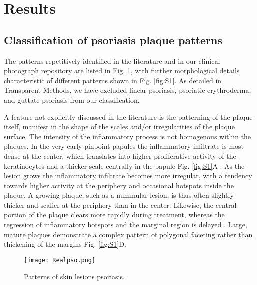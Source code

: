 \section{Results}
\subsection{Classification of psoriasis plaque patterns}
The patterns repetitively identified in the literature and in our clinical photograph repository are listed in Fig. \ref{fig:1}, with further morphological details characteristic of different patterns shown in Fig. \ref{fig:S1}. As detailed in Transparent Methods, we have excluded linear psoriasis, psoriatic erythroderma, and guttate psoriasis from our classification. 

A feature not explicitly discussed in the literature is the patterning of the plaque itself, manifest in the shape of the scales and/or irregularities of the plaque surface. The intensity of the inflammatory process is not homogenous within the plaques. In the very early pinpoint papules the inflammatory infiltrate is most dense at the center, which translates into higher proliferative activity of the keratinocytes and a thicker scale centrally in the papule Fig. \ref{fig:S1}A \citep{soltani1972}. As the lesion grows the inflammatory infiltrate becomes more irregular, with a tendency towards higher activity at the periphery and occasional hotspots inside the plaque. A growing plaque, such as a nummular lesion, is thus often slightly thicker and scalier at the periphery than in the center. Likewise, the central portion of the plaque clears more rapidly during treatment, whereas the regression of inflammatory hotspots and the marginal region is delayed \citep{griffin1988}. Large, mature plaques demonstrate a complex pattern of polygonal faceting rather than thickening of the margins Fig. \ref{fig:S1}D.

\begin{figure}[hb]
	\centering
	\texttt{[image: Realpso.png]}
	\caption{Patterns of skin lesions psoriasis.}
	\label{fig:1}
\end{figure}

